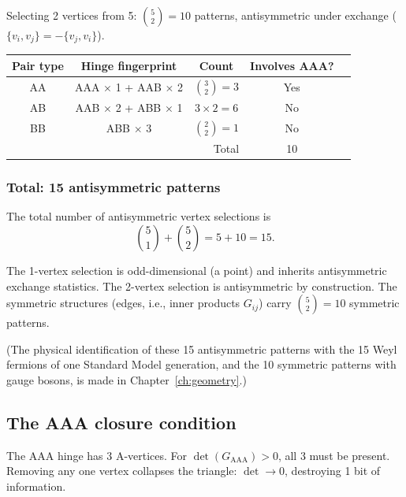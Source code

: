 Selecting 2 vertices from 5: $\binom{5}{2} = 10$ patterns, antisymmetric under exchange ($\{v_i, v_j\} = -\{v_j, v_i\}$).

\begin{center}
\begin{tabular}{ccccc}
\hline
Pair type & Hinge fingerprint & Count & Involves AAA? \\
\hline
AA & AAA $\times$ 1 + AAB $\times$ 2 & $\binom{3}{2} = 3$ & Yes \\
AB & AAB $\times$ 2 + ABB $\times$ 1 & $3 \times 2 = 6$ & No \\
BB & ABB $\times$ 3 & $\binom{2}{2} = 1$ & No \\
\hline
\multicolumn{3}{r}{Total} & 10 \\
\hline
\end{tabular}
\end{center}

\subsubsection{Total: 15 antisymmetric patterns}

\begin{theorem}
\label{thm:15}
The total number of antisymmetric vertex selections is
\begin{equation}
\binom{5}{1} + \binom{5}{2} = 5 + 10 = 15.
\end{equation}
\end{theorem}

The 1-vertex selection is odd-dimensional (a point) and inherits antisymmetric exchange statistics. The 2-vertex selection is antisymmetric by construction. The symmetric structures (edges, i.e., inner products $G_{ij}$) carry $\binom{5}{2} = 10$ symmetric patterns.

(The physical identification of these 15 antisymmetric patterns with the 15 Weyl fermions of one Standard Model generation, and the 10 symmetric patterns with gauge bosons, is made in Chapter~\ref{ch:geometry}.)

\subsection{The AAA closure condition}
\label{sec:confinement_geometry}

\begin{theorem}
\label{thm:aaa_closure}
The AAA hinge has 3 A-vertices. For $\det(G_{\text{AAA}}) > 0$, all 3 must be present. Removing any one vertex collapses the triangle: $\det \to 0$, destroying 1 bit of information.
\end{theorem}

